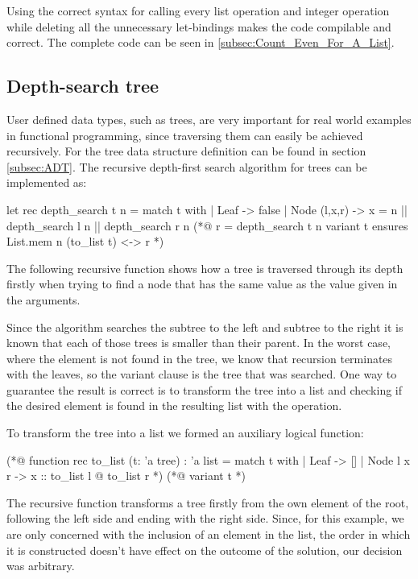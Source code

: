 Using the correct syntax for calling every list operation and integer operation while deleting all the unnecessary let-bindings makes the
code compilable and correct. The complete code can be seen in \ref{subsec:Count_Even_For_A_List}.

\subsection{Depth-search tree}

User defined data types, such as trees, are very important for real world examples in functional programming, since traversing them
can easily be achieved recursively. For the tree data structure definition can be found in section \ref{subsec:ADT}. The recursive 
depth-first search algorithm for trees can be implemented as:

\begin{gospell}
let rec depth_search t n = 
  match t with
  | Leaf -> false
  | Node (l,x,r) -> x = n || depth_search l n || depth_search r n
(*@
  r = depth_search t n
  variant t
  ensures List.mem n (to_list t) <-> r
*)
\end{gospell}

The following recursive function  shows how a tree is traversed through its depth firstly when trying to find
a node that has the same value as the value given in the arguments.

Since the algorithm searches the subtree to the left and subtree to the right it is known that each of those trees is smaller than their
parent. In the worst case, where the element is not found in the tree, we know that recursion terminates with the leaves, so the variant 
clause is the tree that was searched. One way to guarantee the result is correct is to transform the tree into a list and checking if
the desired element is found in the resulting list with the  operation.

To transform the tree into a list we formed an auxiliary logical function:

\begin{gospell}
(*@ function rec to_list (t: 'a tree) : 'a list = 
  match t with
  | Leaf -> []
  | Node l x r -> x :: to_list l @ to_list r
*)
(*@
  variant t
*)
\end{gospell}

The recursive function  transforms a tree firstly from the own element of the root, following the left side and 
ending with the right side. Since, for this example, we are only concerned with the inclusion of an element in the list, the order 
in which it is constructed doesn't have effect on the outcome of the solution, our decision was arbitrary.

